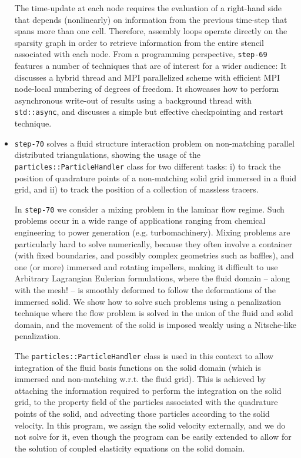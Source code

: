 \documentclass{ansarticle-preprint}
\begin{document}
\begin{itemize}
        The time-update at each node requires the evaluation of a right-hand side
        that depends (nonlinearly) on information from the previous time-step that
        spans more than one cell. Therefore, assembly loops operate directly on the
        sparsity graph in order to retrieve information from the entire stencil
        associated with each node. From a programming perspective, \texttt{step-69}
        features a number of techniques that are of interest for a wider audience:
        It discusses a hybrid thread and MPI parallelized scheme with efficient
        MPI node-local numbering of degrees of freedom. It showcases how to
        perform asynchronous write-out of results using a background thread with
        \texttt{std::async}, and discusses a simple but effective checkpointing and
        restart technique.

  \item \texttt{step-70} solves a fluid structure interaction problem on
        non-matching parallel distributed triangulations, showing the usage of
        the \texttt{particles::ParticleHandler} class for two different tasks:
        i) to track the position of quadrature points of a non-matching
        solid grid immersed in a fluid grid, and ii) to track the position of a
        collection of massless tracers.

        In \texttt{step-70} we consider a mixing problem in the laminar flow
        regime. Such problems occur in a wide range of applications ranging
        from chemical engineering to power generation (e.g. turbomachinery).
        Mixing problems are particularly hard to solve numerically, because
        they often involve a container (with fixed boundaries, and possibly
        complex geometries such as baffles), and one (or more) immersed and
        rotating impellers, making it difficult to use Arbitrary Lagrangian
        Eulerian formulations, where the fluid domain – along with the mesh! –
        is smoothly deformed to follow the deformations of the immersed solid.
        We show how to solve such problems using a penalization technique
        where the flow problem is solved in the union of the fluid and solid
        domain, and the movement of the solid is imposed weakly using a
        Nitsche-like penalization.

        The \texttt{particles::ParticleHandler} class is used in this context
        to allow integration of the fluid basis functions on the solid domain
        (which is immersed and non-matching w.r.t. the fluid grid). This is
        achieved by attaching the information required to perform the
        integration on the solid grid, to the property field of the particles
        associated with the quadrature points of the solid, and advecting those
        particles according to the solid velocity. In this program, we assign
        the solid velocity externally, and we do not solve for it, even though
        the program can be easily extended to allow for the solution of
        coupled elasticity equations on the solid domain.
\end{itemize}
\end{document}
